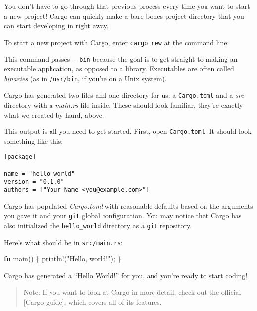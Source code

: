 \documentclass[a4paper,]{book}
\newenvironment{Shaded}{\begin{snugshade}}{\end{snugshade}}
\newcommand{\KeywordTok}[1]{\textcolor[rgb]{0.13,0.29,0.53}{\textbf{{#1}}}}
\newcommand{\StringTok}[1]{\textcolor[rgb]{0.31,0.60,0.02}{{#1}}}
\newcommand{\OtherTok}[1]{\textcolor[rgb]{0.56,0.35,0.01}{{#1}}}
\newcommand{\NormalTok}[1]{{#1}}
\begin{document}
You don't have to go through that previous process every time you want
to start a new project! Cargo can quickly make a bare-bones project
directory that you can start developing in right away.

To start a new project with Cargo, enter \texttt{cargo\ new} at the
command line:

\begin{Shaded}
\end{Shaded}

This command passes \texttt{-\/-bin} because the goal is to get straight
to making an executable application, as opposed to a library.
Executables are often called \emph{binaries} (as in \texttt{/usr/bin},
if you're on a Unix system).

Cargo has generated two files and one directory for us: a
\texttt{Cargo.toml} and a \emph{src} directory with a \emph{main.rs}
file inside. These should look familiar, they're exactly what we created
by hand, above.

This output is all you need to get started. First, open
\texttt{Cargo.toml}. It should look something like this:

\begin{verbatim}
[package]

name = "hello_world"
version = "0.1.0"
authors = ["Your Name <you@example.com>"]
\end{verbatim}

Cargo has populated \emph{Cargo.toml} with reasonable defaults based on
the arguments you gave it and your \texttt{git} global configuration.
You may notice that Cargo has also initialized the \texttt{hello\_world}
directory as a \texttt{git} repository.

Here's what should be in \texttt{src/main.rs}:

\begin{Shaded}
\begin{Highlighting}[]
\KeywordTok{fn} \NormalTok{main() \{}
    \OtherTok{println!}\NormalTok{(}\StringTok{"Hello, world!"}\NormalTok{);}
\NormalTok{\}}
\end{Highlighting}
\end{Shaded}

Cargo has generated a ``Hello World!'' for you, and you're ready to
start coding!

\begin{quote}
Note: If you want to look at Cargo in more detail, check out the
official {[}Cargo guide{]}, which covers all of its features.
\end{quote}
\end{document}
